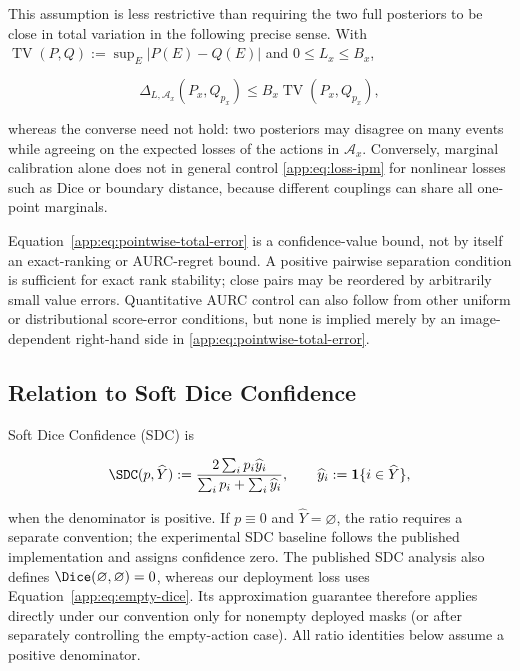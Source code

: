 This assumption is less restrictive than requiring the two full posteriors to
be close in total variation in the following precise sense. With
$\operatorname{TV}(P,Q):=\sup_E|P(E)-Q(E)|$ and
$0\leq L_x\leq B_x$,

\begin{equation}
  \Delta_{L,\mathcal{A}_x}(P_x,Q_{p_x})
  \leq B_x\operatorname{TV}(P_x,Q_{p_x}),
\end{equation}

whereas the converse need not hold: two posteriors may disagree on many
events while agreeing on the expected losses of the actions in
$\mathcal{A}_x$.  Conversely, marginal calibration alone does not in
general control \eqref{app:eq:loss-ipm} for nonlinear losses such as
Dice or boundary distance, because different couplings can share all
one-point marginals.

Equation~\eqref{app:eq:pointwise-total-error} is a confidence-value
bound, not by itself an exact-ranking or AURC-regret bound. A positive
pairwise separation condition is sufficient for exact rank stability; close
pairs may be reordered by arbitrarily small value errors. Quantitative AURC
control can also follow from other uniform or distributional score-error
conditions, but none is implied merely by an image-dependent right-hand side
in \eqref{app:eq:pointwise-total-error}.

\subsection{Relation to Soft Dice Confidence}

Soft Dice Confidence (SDC) \cite{sdc} is

\begin{equation}
  \SDC(p,\widehat Y)
  :=\frac{2\sum_i p_i\widehat y_i}
          {\sum_i p_i+\sum_i\widehat y_i},
  \qquad
  \widehat y_i:=\mathbf{1}\{i\in\widehat Y\},
  \label{app:eq:sdc}
\end{equation}

when the denominator is positive. If $p\equiv0$ and
$\widehat Y=\varnothing$, the ratio requires a separate convention; the
experimental SDC baseline follows the published implementation and assigns
confidence zero. The published SDC analysis also defines
$\Dice(\varnothing,\varnothing)=0$, whereas our deployment loss uses
Equation~\eqref{app:eq:empty-dice}. Its approximation guarantee therefore
applies directly under our convention only for nonempty deployed masks (or
after separately controlling the empty-action case). All ratio identities
below assume a positive denominator.

